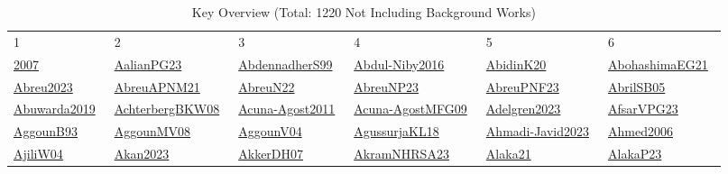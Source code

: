\begin{longtable}{*{6}{l}}
\rowcolor{white}\caption{Key Overview (Total: 1220 Not Including Background Works)}\\ \toprule
\rowcolor{white}1 & 2 & 3 & 4 & 5 & 6\\ \midrule
\endhead
\bottomrule
\endfoot
\href{../}{2007}~\cite{2007} & \href{../scheduling/works/AalianPG23.pdf}{AalianPG23}~\cite{AalianPG23} & \href{../scheduling/works/AbdennadherS99.pdf}{AbdennadherS99}~\cite{AbdennadherS99} & \href{../scheduling/works/Abdul-Niby2016.pdf}{Abdul-Niby2016}~\cite{Abdul-Niby2016} & \href{../scheduling/works/AbidinK20.pdf}{AbidinK20}~\cite{AbidinK20} & \href{../scheduling/works/AbohashimaEG21.pdf}{AbohashimaEG21}~\cite{AbohashimaEG21}\\ 
\href{../scheduling/works/Abreu2023.pdf}{Abreu2023}~\cite{Abreu2023} & \href{../scheduling/works/AbreuAPNM21.pdf}{AbreuAPNM21}~\cite{AbreuAPNM21} & \href{../scheduling/works/AbreuN22.pdf}{AbreuN22}~\cite{AbreuN22} & \href{../scheduling/works/AbreuNP23.pdf}{AbreuNP23}~\cite{AbreuNP23} & \href{../scheduling/works/AbreuPNF23.pdf}{AbreuPNF23}~\cite{AbreuPNF23} & \href{../scheduling/works/AbrilSB05.pdf}{AbrilSB05}~\cite{AbrilSB05}\\ 
\href{../scheduling/works/Abuwarda2019.pdf}{Abuwarda2019}~\cite{Abuwarda2019} & \href{../scheduling/works/AchterbergBKW08.pdf}{AchterbergBKW08}~\cite{AchterbergBKW08} & \href{../scheduling/works/Acuna-Agost2011.pdf}{Acuna-Agost2011}~\cite{Acuna-Agost2011} & \href{../scheduling/works/Acuna-AgostMFG09.pdf}{Acuna-AgostMFG09}~\cite{Acuna-AgostMFG09} & \href{../scheduling/works/Adelgren2023.pdf}{Adelgren2023}~\cite{Adelgren2023} & \href{../scheduling/works/AfsarVPG23.pdf}{AfsarVPG23}~\cite{AfsarVPG23}\\ 
\href{../scheduling/works/AggounB93.pdf}{AggounB93}~\cite{AggounB93} & \href{../}{AggounMV08}~\cite{AggounMV08} & \href{../}{AggounV04}~\cite{AggounV04} & \href{../scheduling/works/AgussurjaKL18.pdf}{AgussurjaKL18}~\cite{AgussurjaKL18} & \href{../}{Ahmadi-Javid2023}~\cite{Ahmadi-Javid2023} & \href{../scheduling/works/Ahmed2006.pdf}{Ahmed2006}~\cite{Ahmed2006}\\ 
\href{../}{AjiliW04}~\cite{AjiliW04} & \href{../scheduling/works/Akan2023.pdf}{Akan2023}~\cite{Akan2023} & \href{../scheduling/works/AkkerDH07.pdf}{AkkerDH07}~\cite{AkkerDH07} & \href{../scheduling/works/AkramNHRSA23.pdf}{AkramNHRSA23}~\cite{AkramNHRSA23} & \href{../scheduling/works/Alaka21.pdf}{Alaka21}~\cite{Alaka21} & \href{../scheduling/works/AlakaP23.pdf}{AlakaP23}~\cite{AlakaP23}\\ 

\end{longtable}
